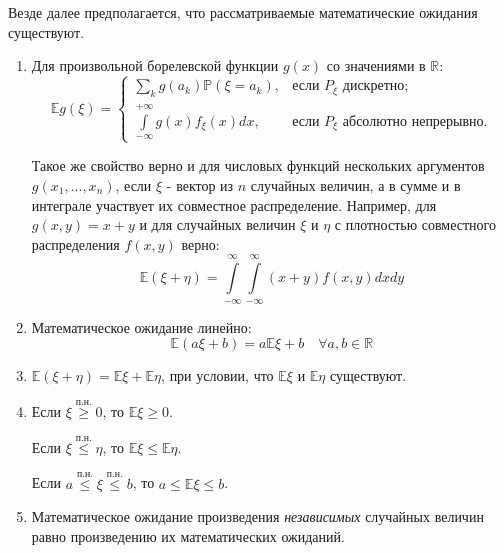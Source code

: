 \begin{namedthm}
    Везде далее предполагается, что рассматриваемые математические ожидания существуют.
\begin{enumerate}
    \item Для произвольной борелевской функции $g(x)$ со значениями в $\mathbb{R}$:
    \begin{equation*}
    \mathbb{E} g(\xi) =
    \begin{cases}
        \sum\limits_{k} g\left(a_{k}\right) \mathbb{P}\left(\xi=a_{k}\right), & \text {если~} P_{\xi} \text {~дискретно}; \\
        \int\limits_{-\infty}^{+\infty} g(x) f_{\xi}(x) d x, & \text {если~} P_{\xi} \text{~абсолютно непрерывно.}
    \end{cases}
    \end{equation*}

    Такое же свойство верно и для числовых функций нескольких аргументов $g(x_1, \ldots, x_n)$, если $\xi$ - вектор из $n$ случайных величин, а в сумме и в интеграле участвует их совместное распределение. Например, для $g(x,y) = x + y$ и для случайных величин $\xi$ и $\eta$ с плотностью совместного распределения $f(x,y)$ верно: 
    \begin{equation}
        \mathbb{E}(\xi+\eta)=\int\limits_{-\infty}^{\infty} \int\limits_{-\infty}^{\infty}(x+y) f(x, y) d x d y
    \end{equation}
   
    \item Математическое ожидание линейно:
    \begin{equation}
        \mathbb{E}(a \xi + b) = a \mathbb{E}\xi + b \quad \forall a,b \in \mathbb{R}
    \end{equation}
    \item $\mathbb{E}(\xi + \eta) = \mathbb{E}\xi + \mathbb{E}\eta$, при условии, что $\mathbb{E}\xi$ и $\mathbb{E}\eta$ существуют.
    
    \item Если $\xi \overset{\text{п.н.}}{\geqslant} 0$, то $\mathbb{E}\xi \geqslant 0.$
    
    \mycon{} Если $\xi \overset{\text{п.н.}}{\leqslant} \eta$, то $\mathbb{E}\xi \leqslant \mathbb{E}\eta.$
    
    \mycon{} Если $a \overset{\text{п.н.}}{\leqslant} \xi \overset{\text{п.н.}}{\leqslant} b$, то $a \leqslant \mathbb{E}\xi \leqslant b$.
    
    \item Математическое ожидание произведения {\it независимых} случайных величин равно произведению их математических ожиданий.
    

\end{enumerate}
\end{namedthm}
